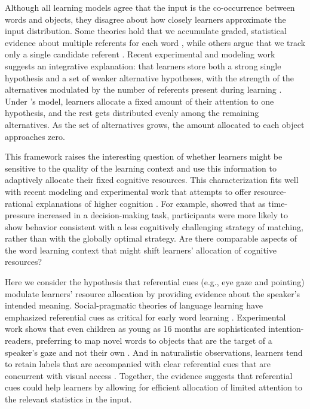 \documentclass[10pt,letterpaper]{article}
\begin{document}
Although all learning models agree that the input is the co-occurrence between words and objects, they disagree about how closely learners approximate the input distribution. Some theories hold that we accumulate graded, statistical evidence about multiple referents for each word \cite{mcmurray2012word}, while others argue that we track only a single candidate referent \cite{trueswell2013propose}. Recent experimental and modeling work suggests an integrative explanation: that learners store both a strong single hypothesis and a set of weaker alternative hypotheses, with the strength of the alternatives modulated by the number of referents present during learning \cite{yurovsky2014algorithmic}. Under 's model, learners allocate a fixed amount of their attention to one hypothesis, and the rest gets distributed evenly among the remaining alternatives. As the set of alternatives grows, the amount allocated to each object approaches zero.

This framework raises the interesting question of whether learners might be sensitive to the quality of the learning context and use this information to adaptively allocate their fixed cognitive resources. This characterization fits well with recent modeling and experimental work that attempts to offer resource-rational explanations of higher cognition \cite{griffiths2014rational}. For example,  showed that as time-pressure increased in a decision-making task, participants were more likely to show behavior consistent with a less cognitively challenging strategy of matching, rather than with the globally optimal strategy. Are there comparable aspects of the word learning context that might shift learners' allocation of cognitive resources?

Here we consider the hypothesis that referential cues (e.g., eye gaze and pointing) modulate learners' resource allocation by providing evidence about the speaker's intended meaning. Social-pragmatic theories of language learning have emphasized referential cues as critical for early word learning  \cite{clark2009first}. Experimental work shows that even children as young as 16 months are sophisticated intention-readers, preferring to map novel words to objects that are the target of a speaker's gaze and not their own \cite{baldwin1993infants}. And in naturalistic observations, learners tend to retain labels that are accompanied with clear referential cues that are concurrent with visual access \cite{yu2012embodied}. Together, the evidence suggests that referential cues could help learners by allowing for efficient allocation of limited attention to the relevant statistics in the input.
\end{document}
